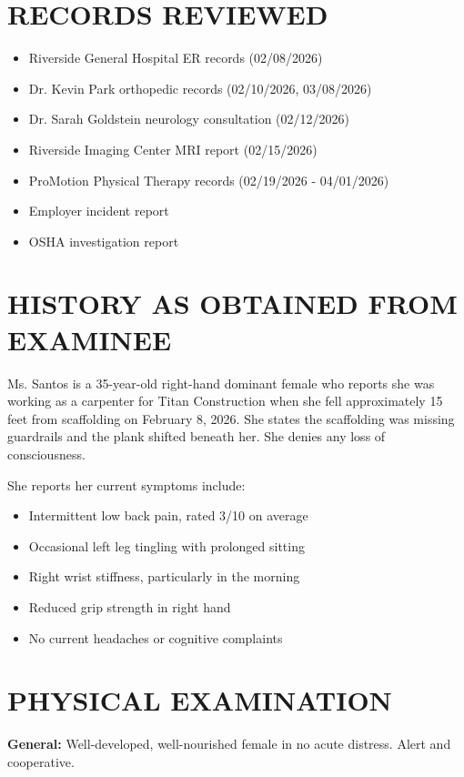 \documentclass[11pt]{article}
\begin{document}
\section*{RECORDS REVIEWED}

\begin{itemize}[nosep]
\item Riverside General Hospital ER records (02/08/2026)
\item Dr. Kevin Park orthopedic records (02/10/2026, 03/08/2026)
\item Dr. Sarah Goldstein neurology consultation (02/12/2026)
\item Riverside Imaging Center MRI report (02/15/2026)
\item ProMotion Physical Therapy records (02/19/2026 - 04/01/2026)
\item Employer incident report
\item OSHA investigation report
\end{itemize}

\section*{HISTORY AS OBTAINED FROM EXAMINEE}

Ms. Santos is a 35-year-old right-hand dominant female who reports she was working as a carpenter for Titan Construction when she fell approximately 15 feet from scaffolding on February 8, 2026. She states the scaffolding was missing guardrails and the plank shifted beneath her. She denies any loss of consciousness.

She reports her current symptoms include:
\begin{itemize}[nosep]
\item Intermittent low back pain, rated 3/10 on average
\item Occasional left leg tingling with prolonged sitting
\item Right wrist stiffness, particularly in the morning
\item Reduced grip strength in right hand
\item No current headaches or cognitive complaints
\end{itemize}

\section*{PHYSICAL EXAMINATION}

\textbf{General:} Well-developed, well-nourished female in no acute distress. Alert and cooperative.
\end{document}
